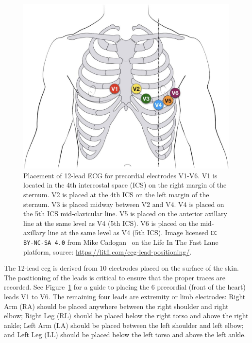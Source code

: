 \documentclass[\main/thesis.tex]{subfiles}
\begin{document}
\begin{figure}[ht]
    \centering
    \includegraphics[width=12cm]{figure/12-lead-ECG-lead-placement.jpg}
    \caption[Placement of 12-lead ECG for precordial electrodes V1-V6.]{Placement of 12-lead ECG for precordial electrodes V1-V6. V1 is located in the 4th intercostal space (ICS) on the right margin of the sternum. V2 is placed at the 4th ICS on the left margin of the sternum. V3 is placed midway between V2 and V4. V4 is placed on the 5th ICS mid-clavicular line. V5 is placed on the anterior axillary line at the same level as V4 (5th ICS). V6 is placed on the mid-axillary line at the same level as V4 (5th ICS).
    Image licensed \texttt{CC BY-NC-SA 4.0} from Mike Cadogan~\cite{ecg-lead-positioning} on the Life In The Fast Lane platform, source: \url{https://litfl.com/ecg-lead-positioning/}.}
    \label{fig:12-lead-ecg-placement}
\end{figure}

The 12-lead \gls{ecg} is derived from 10 electrodes placed on the surface of the skin.
The positioning of the leads is critical to ensure that the proper traces are recorded.
See Figure~\ref{fig:12-lead-ecg-placement} for a guide to placing the 6 precordial (front of the heart) leads V1 to V6.
The remaining four leads are extremity or limb electrodes: Right Arm (RA) should be placed anywhere between the right shoulder and right elbow; Right Leg (RL) should be placed below the right torso and above the right ankle; Left Arm (LA) should be placed between the left shoulder and left elbow; and Left Leg (LL) should be placed below the left torso and above the left ankle.
\end{document}
